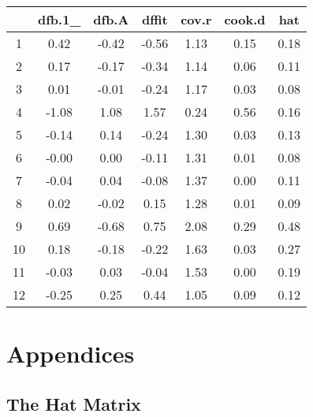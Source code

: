 \documentclass[12pt, a4paper]{report}
\theoremstyle{plain}
\theoremstyle{definition}
\theoremstyle{remark}
\begin{document}
\begin{table}[ht]
\begin{center}
\begin{tabular}{|c|c|c|c|c|c|c|}
  \hline
 & dfb.1\_ & dfb.A & dffit & cov.r & cook.d & hat \\
  \hline
1 & 0.42 & -0.42 & -0.56 & 1.13 & 0.15 & 0.18 \\
  2 & 0.17 & -0.17 & -0.34 & 1.14 & 0.06 & 0.11 \\
  3 & 0.01 & -0.01 & -0.24 & 1.17 & 0.03 & 0.08 \\
  4 & -1.08 & 1.08 & 1.57 & 0.24 & 0.56 & 0.16 \\
  5 & -0.14 & 0.14 & -0.24 & 1.30 & 0.03 & 0.13 \\
  6 & -0.00 & 0.00 & -0.11 & 1.31 & 0.01 & 0.08 \\
  7 & -0.04 & 0.04 & -0.08 & 1.37 & 0.00 & 0.11 \\
  8 & 0.02 & -0.02 & 0.15 & 1.28 & 0.01 & 0.09 \\
  9 & 0.69 & -0.68 & 0.75 & 2.08 & 0.29 & 0.48 \\
  10 & 0.18 & -0.18 & -0.22 & 1.63 & 0.03 & 0.27 \\
  11 & -0.03 & 0.03 & -0.04 & 1.53 & 0.00 & 0.19 \\
  12 & -0.25 & 0.25 & 0.44 & 1.05 & 0.09 & 0.12 \\
   \hline
\end{tabular}
\end{center}
\end{table}






\chapter{Appendices} %
\newpage
\section{The Hat Matrix} %
\end{document}
